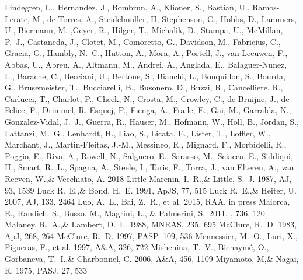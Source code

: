 \documentclass[a4paper,fleqn,usenatbib]{mnras}
\begin{document}
\begin{thebibliography}{99}
Lindegren, L., Hernandez, J., Bombrun, A., Klioner, S., Bastian, U., Ramos-Lerate, M., de Torres, A., Steidelmuller, H, Stephenson, C., Hobbs, D., Lammers, U., Biermann, M. ,Geyer, R., Hilger, T., Michalik, D., Stampa, U., McMillan, P.~J., Castaneda, J., Clotet, M., Comoretto, G., Davidson, M., Fabricius, C., Gracia, G., Hambly, N.~C., Hutton, A., Mora, A., Portell, J., van Leeuwen, F., Abbas, U., Abreu, A., Altmann, M., Andrei, A., Anglada, E., Balaguer-Nunez, L., Barache, C., Becciani, U., Bertone, S., Bianchi, L., Bouquillon, S., Bourda, G., Brusemeister, T., Bucciarelli, B., Busonero, D., Buzzi, R., Cancelliere, R., Carlucci, T., Charlot, P., Cheek, N., Crosta, M., Crowley, C., de Bruijne, J., de Felice, F., Drimmel, R. Esquej, P., Fienga, A., Fraile, E., Gai, M., Garralda, N., Gonzalez-Vidal, J.~J., Guerra, R., Hauser, M., Hofmann, W., Holl, B., Jordan, S., Lattanzi, M.~G., Lenhardt, H., Liao, S., Licata, E., Lister, T., Loffler, W., Marchant, J., Martin-Fleitas, J.-M., Messineo, R., Mignard, F., Morbidelli, R., Poggio, E., Riva, A., Rowell, N., Salguero, E., Sarasso, M., Sciacca, E., Siddiqui, H., Smart, R.~L., Spagna, A., Steele, I., Taris, F., Torra, J., van Elteren, A., van Reeven, W.,\& Vecchiato, A. 2018
Little-Marenin, I.~R.,\& Little, S.~J. 1987, 
AJ, 93, 1539
Luck R.~E.,\& Bond, H.~E. 1991, 
ApJS, 77, 515
Luck R.~E.,\& Heiter, U. 2007, 
AJ, 133, 2464
Luo, A.~L., Bai, Z.~R., et al. 2015, 
RAA, in press
 Maiorca, E., Randich, S., Busso, M., Magrini, L., \& Palmerini, S.\ 2011, \apj, 736, 120 
Malaney, R.~A.,\& Lambert, D.~L. 1988, 
MNRAS, 235, 695
McClure, R.~D. 1983, 
ApJ, 268, 264
McClure, R.~D. 1997, 
PASP, 109, 536
Mennessier, M.~O., Luri, X., Figueras, F., et al. 1997, 
A$\&$A, 326, 722
Mishenina, T.~V., Bienaym\' e, O., Gorbaneva, T.~I.,\& Charbonnel, C. 2006, 
A$\&$A, 456, 1109
Miyamoto, M,\& Nagai, R. 1975, 
PASJ, 27, 533

\end{thebibliography}
\end{document}
